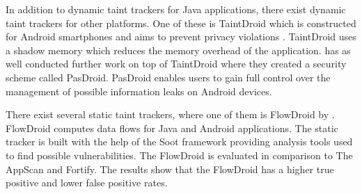 In addition to dynamic taint trackers for Java applications, there exist dynamic taint trackers for other platforms. One of these is TaintDroid which is constructed for Android smartphones and aims to prevent privacy violations \parencite{EnckWilliam2014Taif}. TaintDroid uses a shadow memory which reduces the memory overhead of the application. \textcite{HsiaoS.W.2014PRse} has as well conducted further work on top of TaintDroid where they created a security scheme called PasDroid. PasDroid enables users to gain full control over the management of possible information leaks on Android devices.

There exist several static taint trackers, where one of them is FlowDroid by \textcite{ArztS.2014FPcf}. FlowDroid computes data flows for Java and Android applications. The static tracker is built with the help of the Soot framework \parencite{soot} providing analysis tools used to find possible vulnerabilities. The FlowDroid is evaluated in comparison to The AppScan and Fortify. The results show that the FlowDroid has a higher true positive and lower false positive rates.